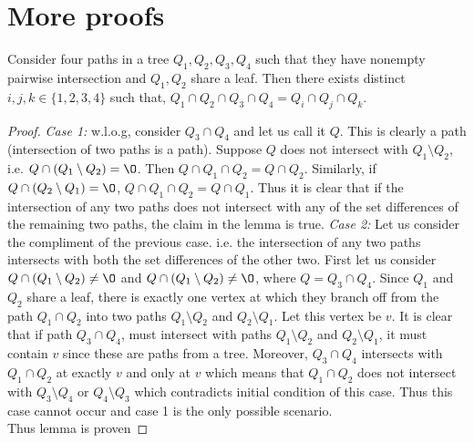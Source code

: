 \chapter{More proofs }
\begin{lemma}
  \label{lem:fourpaths} Consider four paths in a tree $Q_1, Q_2, Q_3,
  Q_4$ such that they have nonempty pairwise intersection and $Q_1,
  Q_2$ share a leaf. Then there exists distinct $i, j, k \in
  \{1,2,3,4\}$ such that, $Q_1 \cap Q_2 \cap Q_3 \cap Q_4 = Q_i \cap
  Q_j \cap Q_k$.
\end{lemma}
\begin{proof}\thesisspacing
  {\em Case 1:} w.l.o.g, consider $Q_3 \cap Q_4$ and let us call it
  $Q$. This is clearly a path (intersection of two paths is a path).
  Suppose $Q$ does not intersect with $Q_1 \setminus Q_2$, i.e. $Q
  \cap (Q_1 \setminus Q_2) = \O$. Then $Q \cap Q_1 \cap Q_2 = Q \cap
  Q_2$. Similarly, if $Q \cap (Q_2 \setminus Q_1) = \O$, $Q \cap Q_1
  \cap Q_2 = Q \cap Q_1$. Thus it is clear that if the intersection of
  any two paths does not intersect with any of the set differences of
  the remaining two paths, the claim in the lemma is true.
  {\em Case 2:} Let us consider the compliment of the previous
  case. i.e. the intersection of any two paths intersects with both
  the set differences of the other two. First let us consider $Q \cap
  (Q_1 \setminus Q_2) \ne \O$ and $Q \cap (Q_1 \setminus Q_2) \ne \O$,
  where $Q = Q_3 \cap Q_4$. Since $Q_1$ and $Q_2$ share a leaf, there
  is exactly one vertex at which they branch off from the path $Q_1
  \cap Q_2$ into two paths $Q_1 \setminus Q_2$ and $Q_2 \setminus
  Q_1$. Let this vertex be $v$. It is clear that if path $Q_3 \cap
  Q_4$, must intersect with paths $Q_1 \setminus Q_2$ and $Q_2
  \setminus Q_1$, it must contain $v$ since these are paths from a
  tree. Moreover, $Q_3 \cap Q_4$ intersects with $Q_1 \cap Q_2$ at
  exactly $v$ and only at $v$ which means that $Q_1 \cap Q_2$ does not
  intersect with $Q_3 \setminus Q_4$ or $Q_4 \setminus Q_3$ which
  contradicts initial condition of this case. Thus this
  case cannot occur and case 1 is the only possible scenario. \\
  Thus lemma is proven %
\end{proof}
